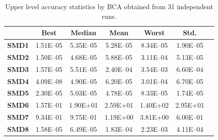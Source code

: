 \documentclass[conference]{IEEEtran}
\begin{document}
\begin{table}[!ht]
\renewcommand{\arraystretch}{1.3}
    \caption{Upper level accuracy statistics by BCA obtained from 31 independent runs.}
    \label{tab:ul-accuracy}
    \centering
    \begin{tabular}{|c|c|c|c|c|c|c|}
\hline
&\textbf{Best}&\textbf{Median}&\textbf{Mean}&\textbf{Worst}&\textbf{Std.}\\ \hline 
\textbf{SMD1} & 1.51E--05 & 5.35E--05 & 5.28E--05 & 8.34E--05 & 1.90E--05 \\ \hline 
\textbf{SMD2} & 1.50E--05 & 4.68E--05 & 5.88E--05 & 3.11E--04 & 5.13E--05 \\ \hline 
\textbf{SMD3} & 1.57E--05 & 5.51E--05 & 2.40E--04 & 3.54E--03 & 6.60E--04 \\ \hline 
\textbf{SMD4} & 4.09E--08 & 4.90E--05 & 6.20E--05 & 3.01E--04 & 6.70E--05 \\ \hline 
\textbf{SMD5} & 2.30E--05 & 5.03E--05 & 4.78E--05 & 8.33E--05 & 1.74E--05 \\ \hline 
\textbf{SMD6} & 1.57E--01 &  1.90E+01 &  2.59E+01 &  1.40E+02 &  2.95E+01 \\ \hline 
\textbf{SMD7} & 9.34E--01 & 9.75E--01 &  1.19E+00 &  3.81E+00 & 6.00E--01 \\ \hline 
\textbf{SMD8} & 1.58E--05 & 6.49E--05 & 1.83E--04 & 2.23E--03 & 4.11E--04 \\ \hline 
    \end{tabular}
\end{table}
\end{document}
